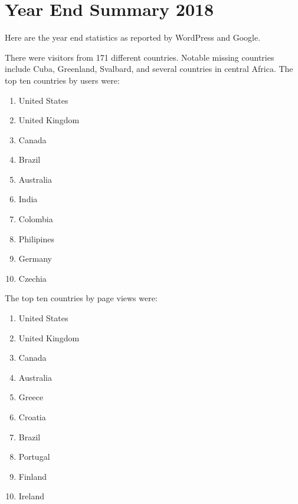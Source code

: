 \section{Year End Summary 2018}

Here are the year end statistics as reported by WordPress and Google.

There were visitors from 171 different countries. Notable missing countries include Cuba, Greenland, Svalbard, and several countries in central Africa. The top ten countries by users were:

\begin{enumerate}


\item United States

\item United Kingdom

\item Canada

\item Brazil

\item Australia

\item India

\item Colombia

\item Philipines

\item Germany

\item Czechia
\end{enumerate}


The top ten countries by page views were:

\begin{enumerate}


\item United States

\item United Kingdom

\item Canada

\item Australia

\item Greece

\item Croatia

\item Brazil

\item Portugal

\item Finland

\item Ireland
\end{enumerate}


